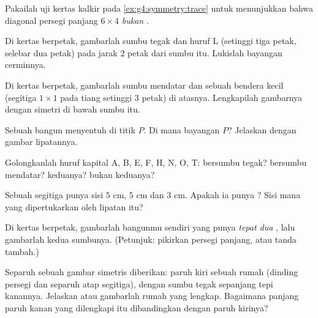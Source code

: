 \begin{exercise}[$\star$]\label{exo:g4:symmetry:3}
Pakailah uji kertas kalkir pada \cref{ex:g4:symmetry:trace} untuk
menunjukkan bahwa diagonal persegi panjang $6 \times 4$ \emph{bukan}
.
\end{exercise}

\begin{exercise}[$\star$]\label{exo:g4:symmetry:4}
Di kertas berpetak, gambarlah sumbu tegak dan huruf L (setinggi tiga
petak, selebar dua petak) pada jarak $2$ petak dari sumbu itu.
Lukislah bayangan cerminnya.
\end{exercise}

\begin{exercise}[$\star$]\label{exo:g4:symmetry:5}
Di kertas berpetak, gambarlah sumbu mendatar dan sebuah bendera
kecil (segitiga $1 \times 1$ pada tiang setinggi $3$ petak) di
atasnya. Lengkapilah gambarnya dengan simetri di bawah sumbu itu.
\end{exercise}

\begin{exercise}[$\star$]\label{exo:g4:symmetry:6}
Sebuah bangun menyentuh  di titik $P$. Di mana
bayangan $P$? Jelaskan dengan gambar lipatannya.
\end{exercise}

\begin{exercise}[$\star$]\label{exo:g4:symmetry:7}
Golongkanlah huruf kapital A, B, E, F, H, N, O, T: bersumbu tegak?
bersumbu mendatar? keduanya? bukan keduanya?
\end{exercise}

\begin{exercise}[$\star$]\label{exo:g4:symmetry:8}
Sebuah segitiga punya sisi $5$ cm, $5$ cm dan $3$ cm. Apakah ia
punya ? Sisi mana yang dipertukarkan oleh lipatan itu?
\end{exercise}

\begin{exercise}[$\star\star$]\label{exo:g4:symmetry:9}
Di kertas berpetak, gambarlah bangunmu sendiri yang punya
\emph{tepat dua} , lalu gambarlah kedua sumbunya.
(Petunjuk: pikirkan persegi panjang, atau tanda tambah.)
\end{exercise}

\begin{exercise}[$\star\star$]\label{exo:g4:symmetry:10}
Separuh sebuah gambar simetris diberikan: paruh kiri sebuah rumah
(dinding persegi dan separuh atap segitiga), dengan sumbu tegak
sepanjang tepi kanannya. Jelaskan atau gambarlah rumah yang lengkap.
Bagaimana panjang paruh kanan yang dilengkapi itu dibandingkan dengan paruh kirinya?
\end{exercise}

